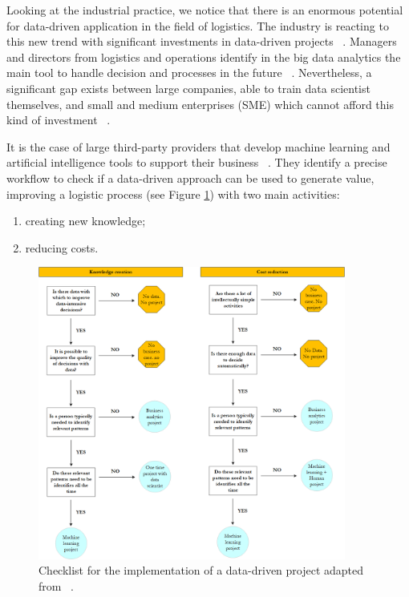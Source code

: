 Looking at the industrial practice, we notice that there is an enormous potential for data-driven application in the field of logistics. The industry is reacting to this new trend with significant investments in data-driven projects ~\cite{Worldeconomicforum2017, Zhong2016}. Managers and directors from logistics and operations identify in the big data analytics the main tool to handle decision and processes in the future ~\cite{Rossmann2018}. Nevertheless, a significant gap exists between large companies, able to train data scientist themselves, and small and medium enterprises (SME) which cannot afford this kind of investment ~\cite{Dubey2019}.\par

It is the case of large third-party providers that develop machine learning and artificial intelligence tools to support their business ~\cite{Ku2018}. They identify a precise workflow to check if a data-driven approach can be used to generate value, improving a logistic process (see Figure \ref{fig_applicationML}) with two main activities:

\begin{enumerate}
    \item creating new knowledge;
    \item reducing costs.

\end{enumerate}

\begin{figure}[hbt!]
\centering
\includegraphics[width=0.9\textwidth]{SectionIntroduction/researchBackground_figures/fig_applicationML.png}
\captionsetup{type=figure}
\caption{Checklist for the implementation of a data-driven project adapted from ~\cite{Ku2018}.}
\label{fig_applicationML}
\end{figure}


